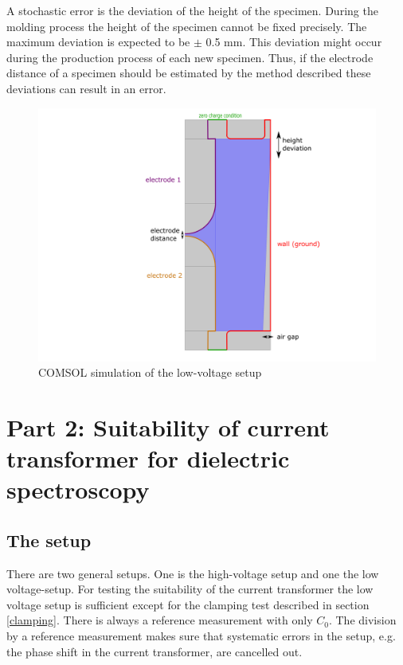 A stochastic error is the deviation of the height of the specimen. During  the molding process the height of the specimen cannot be fixed precisely. The maximum deviation is expected to be $\pm$ 0.5 mm. This deviation might occur during the production process of each new specimen. Thus, if the electrode distance of a specimen should be estimated by the method described these deviations can result in an error. 
 \begin{figure}[htbp]
	\centering
	\includegraphics[width=\textwidth]{figures/Method/Part1_d_C0/cell_colour.png}		
	\caption[Kurze Abbildungsbeschreibung]{COMSOL simulation of the low-voltage setup} 
	\label{fig.syserrors}
\end{figure}

\section{Part 2:  Suitability of current transformer for dielectric spectroscopy}
\subsection{The setup}
There are two general setups. One is the high-voltage setup and one the low voltage-setup. For testing the suitability of the current transformer the low voltage setup is sufficient except for the clamping test described in section \ref{clamping}. There is always a reference measurement with only $C_0$. The division by a reference measurement makes sure that systematic errors in the setup, e.g. the phase shift in the current transformer, are cancelled out. 

